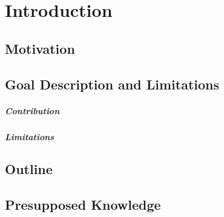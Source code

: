 
\chapter{Introduction}
\label{sec:introduction}


\blindtext


\section{Motivation}
\blindtext

\section{Goal Description and Limitations}
\blindtext

\paragraph{Contribution}
\blindtext

\paragraph{Limitations}
\blindtext

\section{Outline}
\blindtext

\section{Presupposed Knowledge}
\blindtext
